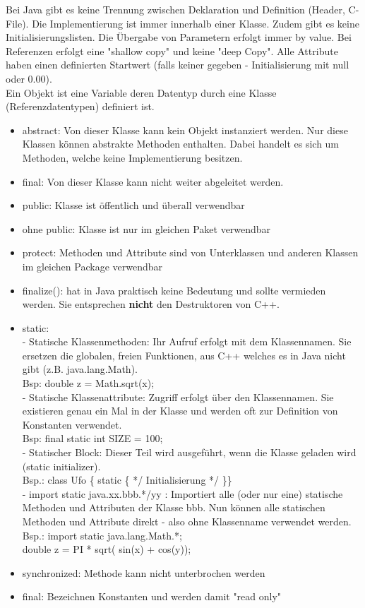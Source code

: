 Bei Java gibt es keine Trennung zwischen Deklaration und Definition (Header, C-File). Die Implementierung ist immer innerhalb einer Klasse. Zudem gibt es keine Initialisierungslisten. Die Übergabe von Parametern erfolgt immer by value. Bei Referenzen erfolgt eine "shallow copy" und keine "deep Copy". 
 Alle Attribute haben einen definierten Startwert (falls keiner gegeben - Initialisierung mit null oder 0.00). \\
 Ein Objekt ist eine Variable deren Datentyp durch eine Klasse (Referenzdatentypen) definiert ist.  
\begin{itemize}
	\item abstract: Von dieser Klasse kann kein Objekt instanziert werden. Nur diese Klassen können abstrakte Methoden enthalten. Dabei handelt es sich um Methoden, welche keine Implementierung besitzen. 
	\item final: Von dieser Klasse kann nicht weiter abgeleitet werden.
	\item public: Klasse ist öffentlich und überall verwendbar
	\item ohne public: Klasse ist nur im gleichen Paket verwendbar
	\item protect: Methoden und Attribute sind von Unterklassen und anderen Klassen im gleichen Package verwendbar
	\item finalize(): hat in Java praktisch keine Bedeutung und sollte vermieden werden. Sie entsprechen \textbf{nicht} den Destruktoren von C++. 
	\item static: \\
	- Statische Klassenmethoden: Ihr Aufruf erfolgt mit dem Klassennamen. Sie ersetzen die globalen, freien Funktionen, aus C++ welches es in Java nicht gibt (z.B. java.lang.Math).  \\
	Bsp: double z = Math.sqrt(x); \\
	- Statische Klassenattribute: Zugriff erfolgt über den Klassennamen. Sie existieren genau ein Mal in der Klasse und werden oft zur Definition von Konstanten verwendet. \\
	Bsp: final static int SIZE = 100; \\
	- Statischer Block: Dieser Teil wird ausgeführt, wenn die Klasse geladen wird (static initializer). \\
	Bsp.: class Ufo \{ static \{ */ Initialisierung */  \}\} \\
	- import static java.xx.bbb.*/yy : Importiert alle (oder nur eine) statische Methoden und Attributen der Klasse bbb. Nun können alle statischen Methoden und Attribute direkt - also ohne Klassenname verwendet werden. \\
	Bsp.: import static java.lang.Math.*; \\
	double z = PI * sqrt( sin(x) + cos(y));
	\item synchronized: Methode kann nicht unterbrochen werden
	\item final: Bezeichnen Konstanten und werden damit "read only"
\end{itemize}

